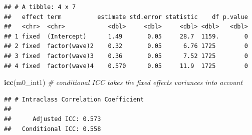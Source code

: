 \documentclass[
]{book}
\newenvironment{Shaded}{\begin{snugshade}}{\end{snugshade}}
\newcommand{\CommentTok}[1]{\textcolor[rgb]{0.56,0.35,0.01}{\textit{#1}}}
\newcommand{\DataTypeTok}[1]{\textcolor[rgb]{0.13,0.29,0.53}{#1}}
\newcommand{\DecValTok}[1]{\textcolor[rgb]{0.00,0.00,0.81}{#1}}
\newcommand{\KeywordTok}[1]{\textcolor[rgb]{0.13,0.29,0.53}{\textbf{#1}}}
\newcommand{\NormalTok}[1]{#1}
\newcommand{\OperatorTok}[1]{\textcolor[rgb]{0.81,0.36,0.00}{\textbf{#1}}}
\newcommand{\StringTok}[1]{\textcolor[rgb]{0.31,0.60,0.02}{#1}}
\begin{document}
\begin{Shaded}
\end{Shaded}

\begin{verbatim}
## # A tibble: 4 x 7
##   effect term          estimate std.error statistic    df p.value
##   <chr>  <chr>            <dbl>     <dbl>     <dbl> <dbl>   <dbl>
## 1 fixed  (Intercept)      1.49       0.05     28.7  1159.       0
## 2 fixed  factor(wave)2    0.32       0.05      6.76 1725        0
## 3 fixed  factor(wave)3    0.36       0.05      7.52 1725        0
## 4 fixed  factor(wave)4    0.570      0.05     11.9  1725        0
\end{verbatim}

\begin{Shaded}
\begin{Highlighting}[]
\KeywordTok{icc}\NormalTok{(m0_int1)  }\CommentTok{# conditional ICC takes the fixed effects variances into account}
\end{Highlighting}
\end{Shaded}

\begin{verbatim}
## # Intraclass Correlation Coefficient
## 
##      Adjusted ICC: 0.573
##   Conditional ICC: 0.558
\end{verbatim}

\begin{Shaded}
\end{Shaded}
\end{document}
